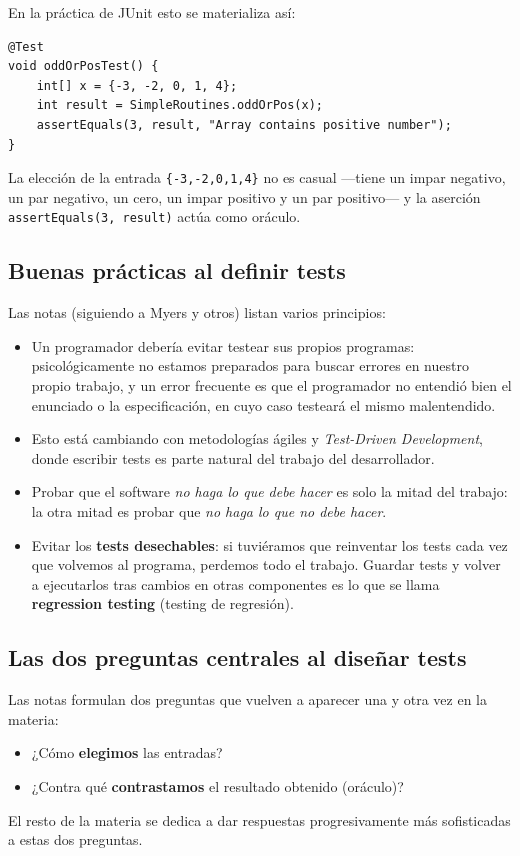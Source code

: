 \documentclass[12pt,a4paper]{article}
\begin{document}
En la práctica de JUnit esto se materializa así:
\begin{lstlisting}[style=javastyle]
@Test
void oddOrPosTest() {
    int[] x = {-3, -2, 0, 1, 4};
    int result = SimpleRoutines.oddOrPos(x);
    assertEquals(3, result, "Array contains positive number");
}
\end{lstlisting}
La elección de la entrada \texttt{\{-3,-2,0,1,4\}} no es casual ---tiene un impar negativo, un par negativo, un cero, un impar positivo y un par positivo--- y la aserción \texttt{assertEquals(3, result)} actúa como oráculo.

\subsection{Buenas prácticas al definir tests}
Las notas (siguiendo a Myers y otros) listan varios principios:
\begin{itemize}
  \item Un programador debería evitar testear sus propios programas: psicológicamente no estamos preparados para buscar errores en nuestro propio trabajo, y un error frecuente es que el programador no entendió bien el enunciado o la especificación, en cuyo caso testeará el mismo malentendido.
  \item Esto está cambiando con metodologías ágiles y \textit{Test-Driven Development}, donde escribir tests es parte natural del trabajo del desarrollador.
  \item Probar que el software \textit{no haga lo que debe hacer} es solo la mitad del trabajo: la otra mitad es probar que \textit{no haga lo que no debe hacer}.
  \item Evitar los \textbf{tests desechables}: si tuviéramos que reinventar los tests cada vez que volvemos al programa, perdemos todo el trabajo. Guardar tests y volver a ejecutarlos tras cambios en otras componentes es lo que se llama \textbf{regression testing} (testing de regresión).
\end{itemize}

\subsection{Las dos preguntas centrales al diseñar tests}
Las notas formulan dos preguntas que vuelven a aparecer una y otra vez en la materia:
\begin{itemize}
  \item ¿Cómo \textbf{elegimos} las entradas?
  \item ¿Contra qué \textbf{contrastamos} el resultado obtenido (oráculo)?
\end{itemize}
El resto de la materia se dedica a dar respuestas progresivamente más sofisticadas a estas dos preguntas.
\end{document}
